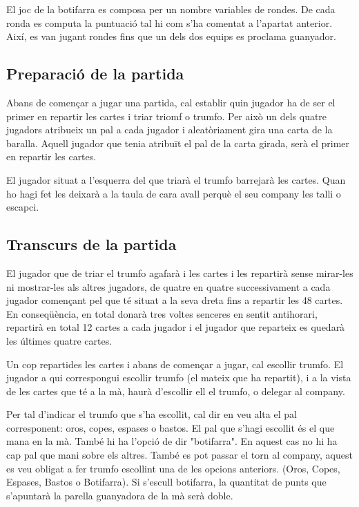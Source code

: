 El joc de la botifarra es composa per un nombre variables de rondes. De cada ronda es computa la puntuació tal hi com s'ha comentat a l'apartat anterior. Així, es van jugant rondes fins que un dels dos equips es proclama guanyador.

\subsection{Preparació de la partida}

Abans de començar a jugar una partida, cal establir quin jugador ha de ser el primer en repartir les cartes i triar triomf o trumfo. Per això un dels quatre jugadors atribueix un pal a cada jugador i aleatòriament gira una carta de la baralla. Aquell jugador que tenia atribuït el pal de la carta girada, serà el primer en repartir les cartes.

El jugador situat a l'esquerra del que triarà el trumfo barrejarà les cartes. Quan ho hagi fet les deixarà a la taula de cara avall perquè el seu company les talli o escapci.

\subsection{Transcurs de la partida}

El jugador que de triar el trumfo agafarà i les cartes i les repartirà sense mirar-les ni mostrar-les als altres jugadors, de quatre en quatre successivament a cada jugador començant pel que té situat a la seva dreta fins a repartir les 48 cartes. En conseqüència, en total donarà tres voltes senceres en sentit antihorari, repartirà en total 12 cartes a cada jugador i el jugador que reparteix es quedarà les últimes quatre cartes.

Un cop repartides les cartes i abans de començar a jugar, cal escollir trumfo. El jugador a qui correspongui escollir trumfo (el mateix que ha repartit), i a la vista de les cartes que té a la mà, haurà d'escollir ell el trumfo, o delegar al company.

Per tal d'indicar el trumfo que s'ha escollit, cal dir en veu alta el pal corresponent: oros, copes, espases o bastos. El pal que s'hagi escollit és el que mana en la mà. També hi ha l'opció de dir "botifarra". En aquest cas no hi ha cap pal que mani sobre els altres. També es pot passar el torn al company, aquest es veu obligat a fer trumfo escollint una de les opcions anteriors. (Oros, Copes, Espases, Bastos o Botifarra). Si s'escull botifarra, la quantitat de punts que s'apuntarà la parella guanyadora de la mà serà doble.


